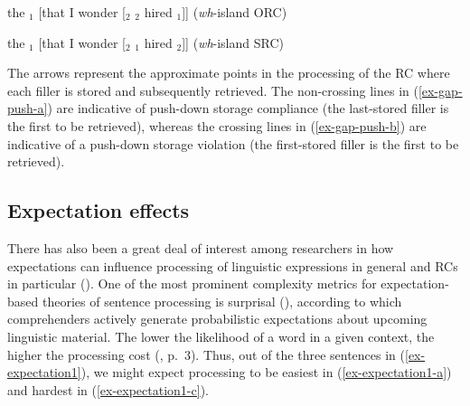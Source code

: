 \pex \label{ex-gap-push}
\a
\ljudge*the $_1$ [that I wonder [$_2$ $_2$ hired $_1$]] (\textit{wh}-island ORC)
\vspace{7pt}\label{ex-gap-push-a}
\a
\ljudge*the $_1$ [that I wonder [$_2$ $_1$ hired $_2$]] (\textit{wh}-island SRC)
\vspace{7pt}\label{ex-gap-push-b}
\xe 

\noindent The arrows represent the approximate points in the processing of the RC where each filler is stored and subsequently retrieved. The non-crossing lines in (\ref{ex-gap-push-a}) are indicative of push-down storage compliance (the last-stored filler is the first to be retrieved), whereas the crossing lines in (\ref{ex-gap-push-b}) are indicative of a push-down storage violation (the first-stored filler is the first to be retrieved).

\subsection{Expectation effects}\label{gap-expectation}

There has also been a great deal of interest among researchers in how expectations can influence processing of linguistic expressions in general and RCs in particular (\cite{hale2001,hale2003,hale2006,jager.etal2015,kim2013,levy2008,roland.etal2012,rohde.etal2011}). One of the most prominent complexity metrics for expectation-based theories of sentence processing is surprisal (\cite{hale2001,levy2008}), according to which comprehenders actively generate probabilistic expectations about upcoming linguistic material. The lower the likelihood of a word in a given context, the higher the processing cost (\cite{ronai.xiang2023}, p.~3). Thus, out of the three sentences in (\ref{ex-expectation1}), we might expect processing to be easiest in (\ref{ex-expectation1-a}) and hardest in (\ref{ex-expectation1-c}).

